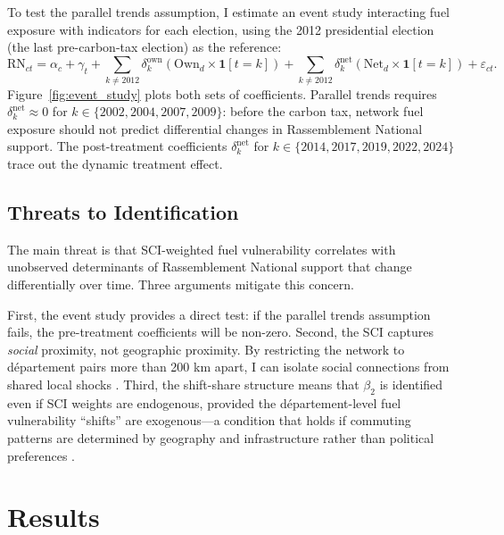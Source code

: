 \documentclass[12pt]{article}
\newcommand{\rn}{Rassemblement National}
\newcommand{\dept}{d\'{e}partement}
\begin{document}
To test the parallel trends assumption, I estimate an event study interacting fuel exposure with indicators for each election, using the 2012 presidential election (the last pre-carbon-tax election) as the reference:
\begin{equation}
\text{RN}_{ct} = \alpha_c + \gamma_t + \sum_{k \neq 2012} \delta^{\text{own}}_k (\text{Own}_d \times \mathbf{1}[t = k]) + \sum_{k \neq 2012} \delta^{\text{net}}_k (\text{Net}_d \times \mathbf{1}[t = k]) + \varepsilon_{ct}.
\label{eq:event_study}
\end{equation}
Figure~\ref{fig:event_study} plots both sets of coefficients. Parallel trends requires $\delta^{\text{net}}_k \approx 0$ for $k \in \{2002, 2004, 2007, 2009\}$: before the carbon tax, network fuel exposure should not predict differential changes in \rn{} support. The post-treatment coefficients $\delta^{\text{net}}_k$ for $k \in \{2014, 2017, 2019, 2022, 2024\}$ trace out the dynamic treatment effect.

\subsection{Threats to Identification}

The main threat is that SCI-weighted fuel vulnerability correlates with unobserved determinants of \rn{} support that change differentially over time. Three arguments mitigate this concern.

First, the event study provides a direct test: if the parallel trends assumption fails, the pre-treatment coefficients will be non-zero. Second, the SCI captures \emph{social} proximity, not geographic proximity. By restricting the network to \dept{} pairs more than 200 km apart, I can isolate social connections from shared local shocks \citep{bailey2020social}. Third, the shift-share structure means that $\beta_2$ is identified even if SCI weights are endogenous, provided the \dept{}-level fuel vulnerability ``shifts'' are exogenous---a condition that holds if commuting patterns are determined by geography and infrastructure rather than political preferences \citep{borusyak2022quasi}.



\section{Results}
\label{sec:results}
\end{document}
